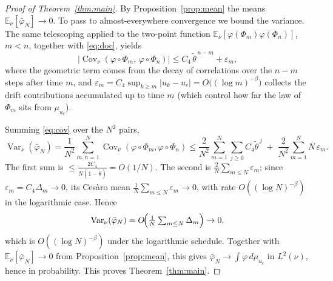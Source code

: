 \documentclass[11pt,a4paper]{article}
\theoremstyle{definition}
\begin{document}
\begin{proof}[Proof of Theorem~\ref{thm:main}]
By Proposition~\ref{prop:mean} the means $\mathbb{E}_\nu[\bar\varphi_N]
\to 0$. To pass to almost-everywhere convergence we bound the variance.
The same telescoping applied to the two-point function
$\mathbb{E}_\nu[\varphi(\Phi_m)\varphi(\Phi_n)]$, $m < n$, together with
\eqref{eq:doc}, yields
\begin{equation}
\label{eq:cov}
  \bigl|\operatorname{Cov}_\nu(\varphi\circ\Phi_m,\,\varphi\circ\Phi_n)\bigr|
  \leq C_4\,\tilde\theta^{\,n-m} + \varepsilon_m,
\end{equation}
where the geometric term comes from the decay of correlations over the
$n-m$ steps after time $m$, and
$\varepsilon_m = C_4 \sup_{k\ge m}|u_k - u_c| = O\!\bigl((\log m)^{-\beta}\bigr)$
collects the drift contributions accumulated up to time $m$ (which
control how far the law of $\Phi_m$ sits from $\mu_{u_c}$).

Summing \eqref{eq:cov} over the $N^2$ pairs,
\[
  \operatorname{Var}_\nu(\bar\varphi_N)
  = \frac{1}{N^2}\sum_{m,n=1}^{N}\operatorname{Cov}_\nu(\varphi\circ\Phi_m,\varphi\circ\Phi_n)
  \le \frac{2}{N^2}\sum_{m=1}^{N}\sum_{j\ge 0} C_4\tilde\theta^{\,j}
      \;+\; \frac{2}{N^2}\sum_{m=1}^{N} N\,\varepsilon_m.
\]
The first sum is $\le \frac{2C_4}{N(1-\tilde\theta)} = O(1/N)$. The
second is $\frac{2}{N}\sum_{m\le N}\varepsilon_m$; since
$\varepsilon_m = C_4\Delta_m \to 0$, its Cesàro mean
$\frac1N\sum_{m\le N}\varepsilon_m \to 0$, with rate
$O((\log N)^{-\beta})$ in the logarithmic case. Hence
\begin{equation}
\label{eq:var}
  \operatorname{Var}_\nu(\bar\varphi_N) = O\!\Bigl(\tfrac1N\textstyle\sum_{m\le N}\Delta_m\Bigr) \to 0,
\end{equation}
which is $O((\log N)^{-\beta})$ under the logarithmic schedule. Together
with $\mathbb{E}_\nu[\bar\varphi_N]\to0$ from Proposition~\ref{prop:mean},
this gives $\bar\varphi_N\to\int\varphi\,d\mu_{u_c}$ in $L^2(\nu)$, hence
in probability. This proves Theorem~\ref{thm:main}.
\end{proof}
\end{document}
